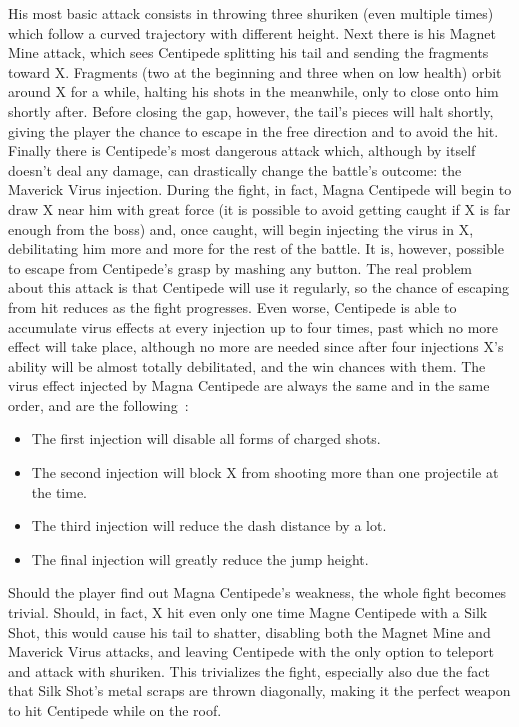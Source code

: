 His most basic attack consists in throwing three shuriken (even multiple times) which follow a curved trajectory with different height. Next there is his Magnet Mine attack, which sees Centipede splitting his tail and sending the fragments toward X. Fragments (two at the beginning and three when on low health) orbit around X for a while, halting his shots in the meanwhile, only to close onto him shortly after. Before closing the gap, however, the tail's pieces will halt shortly, giving the player the chance to escape in the free direction and to avoid the hit. Finally there is Centipede's most dangerous attack which, although by itself doesn't deal any damage, can drastically change the battle's outcome: the Maverick Virus injection. During the fight, in fact, Magna Centipede will begin to draw X near him with great force (it is possible to avoid getting caught if X is far enough from the boss) and, once caught, will begin injecting the virus in X, debilitating him more and more for the rest of the battle. It is, however, possible to escape from Centipede's grasp by mashing any button. The real problem about this attack is that Centipede will use it regularly, so the chance of escaping from hit reduces as the fight progresses. Even worse, Centipede is able to accumulate virus effects at every injection up to four times, past which no more effect will take place, although no more are needed since after four injections X's ability will be almost totally debilitated, and the win chances with them. The virus effect injected by Magna Centipede are always the same and in the same order, and are the following~\cite{wiki:Magna_centipede}:
\begin{itemize}
	\item The first injection will disable all forms of charged shots.
	\item The second injection will block X from shooting more than one projectile at the time.
	\item The third injection will reduce the dash distance by a lot.
	\item The final injection will greatly reduce the jump height.
\end{itemize}

Should the player find out Magna Centipede's weakness, the whole fight becomes trivial. Should, in fact, X hit even only one time Magne Centipede with a Silk Shot, this would cause his tail to shatter, disabling both the Magnet Mine and Maverick Virus attacks, and leaving Centipede with the only option to teleport and attack with shuriken. This trivializes the fight, especially also due the fact that Silk Shot's metal scraps are thrown diagonally, making it the perfect weapon to hit Centipede while on the roof.

